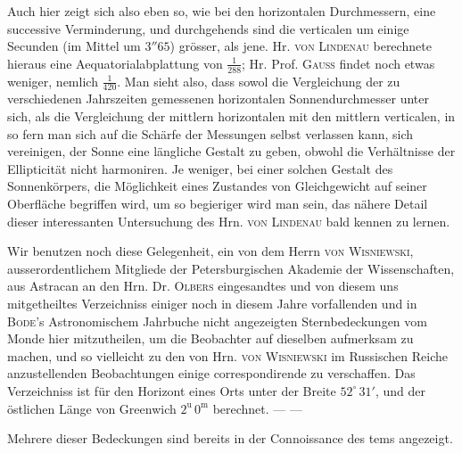 Auch hier zeigt sich also eben so, wie bei den horizontalen Durchmessern, eine successive Verminderung, und durchgehends sind die verticalen um einige Secunden (im Mittel um $3''65$) grösser, als jene. Hr. \textsc{von Lindenau} berechnete hieraus eine Aequatorialabplattung von $\tfrac{1}{288}$; Hr. Prof. \textsc{Gauss} findet noch etwas weniger, nemlich $\tfrac{1}{420}$. Man sieht also, dass sowol die Vergleichung der zu verschiedenen Jahrszeiten gemessenen horizontalen Sonnendurchmesser unter sich, als die Vergleichung der mittlern horizontalen mit den mittlern verticalen, in so fern man sich auf die Schärfe der Messungen selbst verlassen kann, sich vereinigen, der Sonne eine längliche Gestalt zu geben, obwohl die Verhältnisse der Ellipticität nicht harmoniren. Je weniger, bei einer solchen Gestalt des Sonnenkörpers, die Möglichkeit eines Zustandes von Gleichgewicht auf seiner Oberfläche begriffen wird, um so begieriger wird man sein, das nähere Detail dieser interessanten Untersuchung des Hrn. \textsc{von Lindenau} bald kennen zu lernen.

Wir benutzen noch diese Gelegenheit, ein von dem Herrn \textsc{von Wisniewski}, ausserordentlichem Mitgliede der Petersburgischen Akademie der Wissenschaften, aus Astracan an den Hrn. Dr. \textsc{Olbers} eingesandtes und von diesem uns mitgetheiltes Verzeichniss einiger noch in diesem Jahre vorfallenden und in \textsc{Bode}'s Astronomischem Jahrbuche nicht angezeigten Sternbedeckungen vom Monde hier mitzutheilen, um die Beobachter auf dieselben aufmerksam zu machen, und so vielleicht zu den von Hrn. \textsc{von Wisniewski} im Russischen Reiche anzustellenden Beobachtungen einige correspondirende zu verschaffen. Das Verzeichniss ist für den Horizont eines Orts unter der Breite $52^{\circ}\,31'$, und der östlichen Länge von Greenwich $2^{\mathrm u}\,0^{\mathrm m}$ berechnet. — —

Mehrere dieser Bedeckungen sind bereits in der Connoissance des tems angezeigt.
